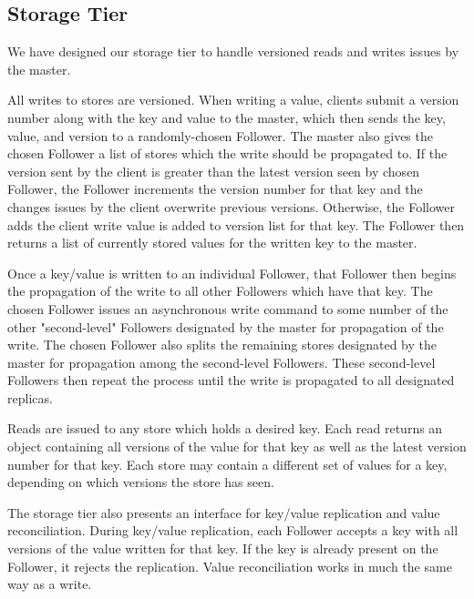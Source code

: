 \documentclass[twoside]{article}
\begin{document}
\begin{multicols}{2}
\subsection*{Storage Tier}
We have designed our storage tier to handle versioned reads and writes issues by the master. 

All writes to stores are versioned. When writing a value, clients submit a version number along with the key and value to the master, which then sends the key, value, and version to a randomly-chosen Follower. The master also gives the chosen Follower a list of stores which the write should be propagated to. If the version sent by the client is greater than the latest version seen by chosen Follower, the Follower increments the version number for that key and the changes issues by the client overwrite previous versions. Otherwise, the Follower adds the client write value is added to version list for that key. The Follower then returns a list of currently stored values for the written key to the master.

Once a key/value is written to an individual Follower, that Follower then begins the propagation of the write to all other Followers which have that key. The chosen Follower issues an asynchronous write command to some number of the other "second-level" Followers designated by the master for propagation of the write. The chosen Follower also splits the remaining stores designated by the master for propagation among the second-level Followers. These second-level Followers then repeat the process until the write is propagated to all designated replicas.

Reads are issued to any store which holds a desired key. Each read returns an object containing all versions of the value for that key as well as the latest version number for that key. Each store may contain a different set of values for a key, depending on which versions the store has seen.

The storage tier also presents an interface for key/value replication and value reconciliation. During key/value replication, each Follower accepts a key with all versions of the value written for that key. If the key is already present on the Follower, it rejects the replication. Value reconciliation works in much the same way as a write.

\end{multicols}
\end{document}
